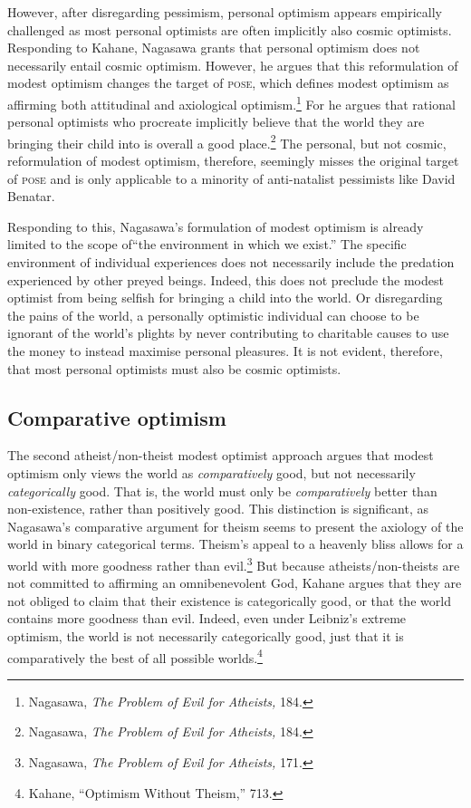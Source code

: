 However, after disregarding pessimism, personal optimism appears
empirically challenged as most personal optimists are often implicitly
also cosmic optimists. Responding to Kahane, Nagasawa grants that
personal optimism does not necessarily entail cosmic optimism. However,
he argues that this reformulation of modest optimism changes the target
of \textsc{pose}, which defines modest optimism as affirming both attitudinal and
axiological optimism.\footnote{Nagasawa, \emph{The Problem of Evil for
  Atheists,} 184.} For he argues that rational personal optimists who
procreate implicitly believe that the world they are bringing their
child into is overall a good place.\footnote{Nagasawa, \emph{The Problem of Evil for
  Atheists,} 184.} The personal, but
not cosmic, reformulation of modest optimism, therefore, seemingly
misses the original target of \textsc{pose} and is only applicable to a minority
of anti-natalist pessimists like David Benatar.

Responding to this, Nagasawa's formulation of modest optimism is already
limited to the scope of``the environment in which we exist.'' The
specific environment of individual experiences does not necessarily
include the predation experienced by other preyed beings. Indeed, this
does not preclude the modest optimist from being selfish for bringing a
child into the world. Or disregarding the pains of the world, a
personally optimistic individual can choose to be ignorant of the
world's plights by never contributing to charitable causes to use the
money to instead maximise personal pleasures. It is not evident,
therefore, that most personal optimists must also be cosmic optimists.

\subsection{Comparative optimism}

The second atheist/non-theist modest optimist approach argues that
modest optimism only views the world as \emph{comparatively} good, but
not necessarily \emph{categorically} good. That is, the world must only
be \emph{comparatively} better than non-existence, rather than
positively good. This distinction is significant, as Nagasawa's
comparative argument for theism seems to present the axiology of the
world in binary categorical terms. Theism's appeal to a heavenly bliss
allows for a world with more goodness rather than evil.\footnote{Nagasawa, \emph{The Problem of Evil for Atheists,} 171.} But because atheists/non-theists are not committed to affirming
an omnibenevolent God, Kahane argues that they are not obliged to claim
that their existence is categorically good, or that the world contains
more goodness than evil. Indeed, even under Leibniz's extreme optimism,
the world is not necessarily categorically good, just that it is
comparatively the best of all possible worlds.\footnote{Kahane,
  ``Optimism Without Theism,'' 713.}

